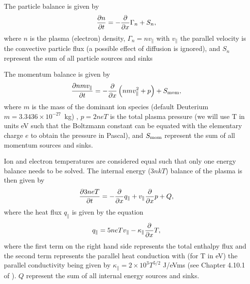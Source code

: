 \documentclass[amsmath,amssymb,a4]{revtex4}
\begin{document}
\noindent The particle balance is given by
\begin{equation}\label{particle_balance}
    {\partial n \over \partial t} = - {\partial \over \partial x} \Gamma_n + S_n,
\end{equation}
where $n$ is the plasma (electron) density, $\Gamma_n = n v_\parallel$ with $v_\parallel$ the parallel velocity is the convective particle flux (a possible effect of diffusion is ignored), and $S_n$ represent the sum of all particle sources and sinks

\noindent The momentum balance is given by
\begin{equation}\label{momentum_balance}
    {\partial n m v_\parallel \over \partial t} = - {\partial \over \partial x} \left( n m v_\parallel^2 + p \right) + S_{\rm mom},
\end{equation}
where $m$ is the mass of the dominant ion species (default Deuterium $m = 3.3436 \times 10^{-27}$~kg) , $p = 2 n e T$ is the total plasma pressure (we will use T in units eV such that the Boltzmann constant can be equated with the elementary charge $e$ to obtain the pressure in Pascal), and $S_{\rm mom}$ represent the sum of all momentum sources and sinks.

\noindent Ion and electron temperatures are considered equal such that only one energy balance needs to be solved. The internal energy ($3 n k T$) balance of the plasma is then given by
\begin{equation}\label{energy_balance}
    {\partial 3 n e T \over \partial t} = - {\partial \over \partial x} q_\parallel + v_\parallel {\partial \over \partial x} p + Q,
\end{equation}
where the heat flux $q_\parallel$ is given by the equation
\begin{equation}\label{heat_flux}
    q_\parallel = 5 n e T v_\parallel - \kappa_\parallel {\partial \over \partial x} T,
\end{equation}
where the first term on the right hand side represents the total enthalpy flux and the second term represents the parallel heat conduction with (for T in eV) the parallel conductivity being given by $\kappa_\parallel = 2 \times 10^3 T^{5/2}$ J/eVms (see Chapter 4.10.1 of \cite{stangeby}). $Q$ represent the sum of all internal energy sources and sinks.
\end{document}
